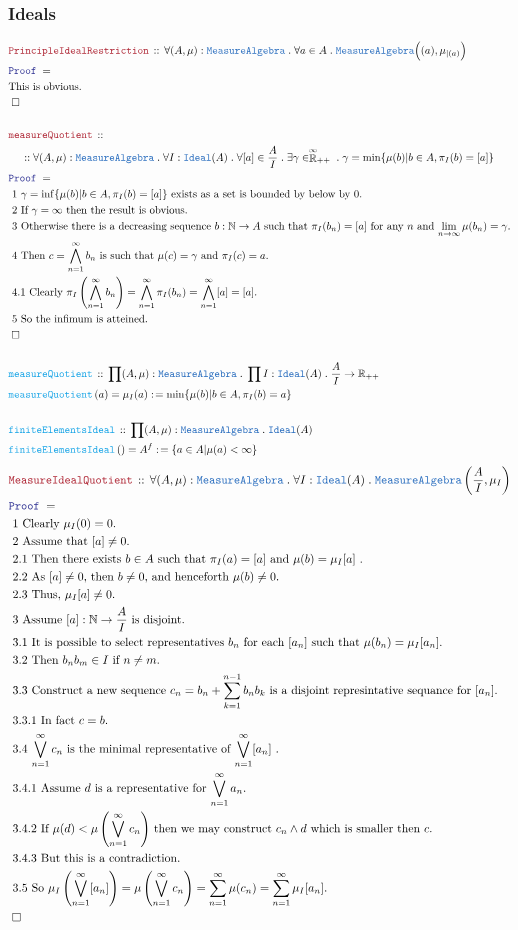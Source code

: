 \documentclass[12pt]{scrartcl}
\newcommand{\TYPE}[1]{\textcolor{NavyBlue}{\mathtt{#1}}}
\newcommand{\FUNC}[1]{\textcolor{Cerulean}{\mathtt{#1}}}
\newcommand{\LOGIC}[1]{\textcolor{Blue}{\mathtt{#1}}}
\newcommand{\THM}[1]{\textcolor{Maroon}{\mathtt{#1}}}
\renewcommand{\.}{\; . \;}
\newcommand{\de}{: \kern 0.1pc =}
\newcommand{\Act}[1]{\left( #1 \right)}
\newcommand{\Theorem}[2]{& \THM{#1} \, :: \, #2 \\ & \Proof = \\ }
\newcommand{\DeclareFunc}[2]{& \FUNC{#1} \, :: \, #2 \\}
\newcommand{\DefineNamedFunc}[4]{&  \FUNC{#1}\Act{#2} = #3 \de #4 \\}
\newcommand{\NewLine}{\\ & \kern 1pc}
\newcommand{\Page}[1]{ \begin{align*} #1 \end{align*}   }
\newcommand{\Reals}{\mathbb{R} }
\newcommand{\Nat}{\mathbb{N} }
\newcommand{\EReals}{\stackrel{\mathclap{\infty}}{\mathbb{R}}}
\newcommand{\QED}{\; \square}
\newcommand{\EndProof}{& \QED \\}
\newcommand{\Proof}{\LOGIC{Proof} \; }
\newcommand{\Explain}[1]{& \text{#1.} \\}
\newcommand{\Ideal}{\TYPE{Ideal}}
\newcommand{\MA}{\TYPE{MeasureAlgebra}}
\begin{document}
\subsubsection{Ideals}
\Page{
	\Theorem{PrincipleIdealRestriction}
	{
		\forall (A,\mu) : \MA \.
		\forall a \in A \.
		\MA\Big( (a), \mu_{|(a)} \Big) 
	}
	\Explain{This is obvious}
	\EndProof
	\\
	\Theorem{measureQuotient}
	{
		\NewLine ::		
		\forall (A,\mu) : \MA \.
		\forall I : \Ideal(A) \.
		\forall [a] \in \frac{A}{I} \.
		\exists \gamma \in \EReals_{++} \.
		\gamma = \min \{ \mu(b) | b \in A, \pi_I(b) = [a] \}	
	}
	\Explain{ 1 $\gamma = \inf \{ \mu(b) | b \in A, \pi_I(b) = [a] \}$ exists as a set
	 is bounded by below by $0$}
	\Explain{ 2 If $\gamma = \infty$ then the result is obvious}
	\Explain{ 3 Otherwise there is a decreasing sequence $b : \Nat \to A$ 
		such that $\pi_I(b_n) = [a]$ for any $n$ and 
		$\lim_{n \to \infty} \mu(b_n) = \gamma$}
	\Explain{ 4 Then  $c = \bigwedge^\infty_{n=1} b_n$
		is such that $\mu(c) = \gamma$ and $\pi_I(c) = a$}
	\Explain{ 4.1 Clearly 
		$
		\pi_I\left(\bigwedge^\infty_{n=1} b_n \right) = 
		\bigwedge^\infty_{n=1} \pi_I(b_n) =
		\bigwedge^\infty_{n=1} [a] = [a]		
		$}
	\Explain{ 5 So the infimum is atteined}
	\EndProof
	\\
	\DeclareFunc{measureQuotient}
	{  \prod (A,\mu) : \MA \. 
		\prod I : \Ideal(A) \.
		\frac{A}{I} \to \Reals_{++}
	}
	\DefineNamedFunc{measureQuotient}
	{a}{\mu_{I}(a)}
	{
		\min \{ \mu(b) | b \in A, \pi_I(b) = a \}	
	}
	\\
	\DeclareFunc{finiteElementsIdeal}{\prod (A,\mu) : \MA \. \Ideal(A)}
	\DefineNamedFunc{finiteElementsIdeal}{}{A^f}{\{a \in A | \mu(a) < \infty \}}
}\Page{
	\Theorem{MeasureIdealQuotient}
	{
		\forall (A,\mu) : \MA \.
		\forall I : \Ideal(A) \.		
		\MA\left( \frac{A}{I}, \mu_{I} \right) 
	}
	\Explain{ 1 Clearly $\mu_I(0) = 0$}
	\Explain{ 2 Assume that $[a] \neq 0$}
	\Explain{ 2.1 Then there exists $b \in A$ such that $\pi_I(a) = [a]$ and $\mu(b) = \mu_I[a]$ }
	\Explain{ 2.2 As $[a] \neq 0$, then $b \neq 0$, and henceforth $\mu(b) \neq 0$}
	\Explain{ 2.3 Thus, $\mu_I[a] \neq 0$}
	\Explain{ 3 Assume $[a] : \Nat \to \frac{A}{I}$ is disjoint}
	\Explain{ 3.1 It is possible to select representatives $b_n$ for each $[a_n]$ 
		such that $\mu(b_n) = \mu_I[a_n]$}
	\Explain{ 3.2 Then $b_n b_m \in I$ if $n \neq m$}	
	\Explain{ 3.3 Construct a new sequence 
		$c_n = b_n + \sum^{n-1}_{k=1} b_n b_k$ is a disjoint represintative sequance for $[a_n]$}
	\Explain{ 3.3.1 In fact $c = b$}
	\Explain{ 3.4 $\bigvee^\infty_{n=1} c_n$ is the minimal representative 
		of $\bigvee^\infty_{n=1} [a_n]$ }
	\Explain{ 3.4.1  Assume $d$ is a representative for $\bigvee^\infty_{n=1} a_n$}
	\Explain{ 3.4.2 If $\mu(d) < \mu\left(\bigvee^\infty_{n=1} c_n\right)$ 
		then we may construct $c_n \wedge d$ which is smaller then $c$}
	\Explain{ 3.4.3  But this is a contradiction}
	\Explain{ 3.5 So 
		$\mu_I\left(\bigvee^\infty_{n=1} [a_n]\right) =  
		\mu\left( \bigvee^\infty_{n=1} c_n \right) = 
		\sum^\infty_{n=1} \mu(c_n) =
		\sum^\infty_{n=1} \mu_I[a_n]
		$}	
	\EndProof
}
\newpage
\end{document}

